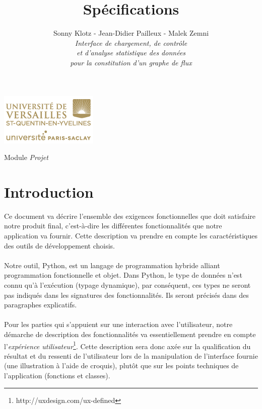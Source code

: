 

\title{\vspace{\fill}\textbf{\Huge Spécifications}}
\author{
	Sonny Klotz - Jean-Didier Pailleux - Malek Zemni
	\vspace{2em}\\
	\textit{Interface de chargement, de contrôle}\\\textit{et d’analyse statistique des données}\\\textit{pour la constitution d’un graphe de flux}
	\vspace{2em}
}


\clearpage
\maketitle\vspace{8em}
\begin{center}\includegraphics[scale=0.7]{../Cahier/logo.png}\end{center}
\begin{flushright}Module \textit{Projet}\end{flushright}
\newpage
\tableofcontents
\newpage\clearpage{}

	\section*{Introduction}
		Ce document va décrire l'ensemble des exigences fonctionnelles que doit satisfaire notre produit final, c'est-à-dire les différentes fonctionnalités que notre application va fournir. Cette description va prendre en compte les caractéristiques des outils de développement choisis.
		\paragraph{}Notre outil, Python, est un langage de programmation hybride alliant programmation fonctionnelle et objet. Dans Python, le type de données n'est connu qu'à l'exécution (typage dynamique), par conséquent, ces types ne seront pas indiqués dans les signatures des fonctionnalités. Ils seront précisés dans des paragraphes explicatifs.
		\paragraph{}Pour les parties qui s'appuient sur une interaction avec l'utilisateur, notre démarche de description des fonctionnalités va essentiellement prendre en compte l'\textit{expérience utilisateur}\footnote{http://uxdesign.com/ux-defined}. Cette description sera donc axée sur la qualification du résultat et du ressenti de l'utilisateur lors de la manipulation de l'interface fournie (une illustration à l'aide de croquis), plutôt que sur les points techniques de l'application (fonctions et classes).
